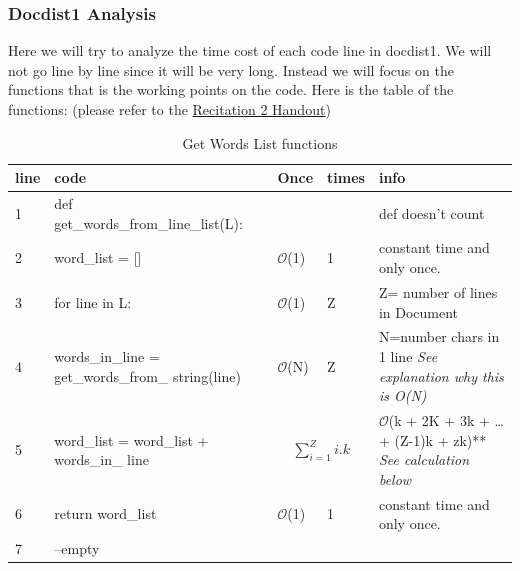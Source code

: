 \documentclass{article}
\begin{document}
    \subsubsection{Docdist1 Analysis}
    Here we will try to analyze the time cost of each code line in docdist1. We will not go line by line since it will be very long. Instead we will focus on the functions that is the working points on the code.
    Here is the table of the functions: (please refer to the \href{https://ocw.mit.edu/courses/electrical-engineering-and-computer-science/6-006-introduction-to-algorithms-fall-2011/recitation-videos/MIT6_006F11_rec02_handout.pdf}{Recitation 2 Handout})
    \begin{table}[H]
        \begin{center}
            \caption{Get Words List functions}
            \begin{tabular}{l|p{5cm}|l|l|p{5cm}}
                \hline
                line & code & Once & times & info\\
                \hline
                1 & def get\_words\_from\_line\_list(L): & & & def doesn't count\\
                \hline
                2 & word\_list = [] &$\mathcal{O}$(1) & 1 & constant time and only  once.\\
                \hline
                3 & for line in L: &$\mathcal{O}$(1) & Z & Z= number of lines in Document\\
                \hline
                4 & words\_in\_line = get\_words\_from\_ string(line) &$\mathcal{O}$(N) & Z & N=number chars in 1 line \textit{See explanation why this is O(N)}\\ 
                \hline
                5 & word\_list = word\_list + words\_in\_ line & \multicolumn{2}{|c|}{$\sum_{i=1}^{Z}i.k$}& $\mathcal{O}$(k + 2K + 3k + \dots + (Z-1)k + zk)** \textit{See calculation below}\\
                \hline
                6 & return word\_list  &$\mathcal{O}$(1) & 1 & constant time and only  once.\\
                \hline
                7 &  --empty \\ 
                \hline
                
            \end{tabular}
        \end{center}
    \end{table}
\end{document}
